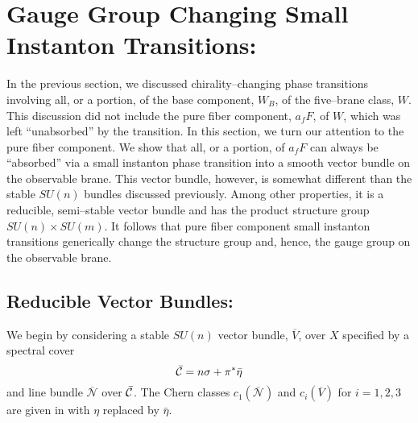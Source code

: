 \documentclass[a4paper,12pt]{article}
\numberwithin{equation}{section}
\def\cN{{\mathcal N}}
\theoremstyle{plain}
\begin{document}

\section{Gauge Group Changing Small Instanton Transitions:}


In the previous section, we discussed chirality--changing 
phase transitions involving all, or a portion, of the base component, 
$W_{B}$, of the five--brane class, $W$. This discussion did not include the pure
fiber component, $a_{f}F$, of $W$, which was left ``unabsorbed'' by the
transition. In this section, we turn our attention to the pure fiber
component. We show that all, or a portion, of $a_{f}F$ 
can always be ``absorbed'' via a small instanton
phase transition into a smooth vector bundle on the observable brane. This
vector bundle, however, is somewhat different than the stable
$SU(n)$ bundles discussed previously. Among other properties, it is a 
reducible, semi--stable vector bundle and has the product 
structure group $SU(n) \times SU(m)$. 
It follows that pure fiber component small instanton transitions generically 
change the structure group and, hence, the gauge group on the observable
brane.

\subsection*{Reducible Vector Bundles:}

We begin by considering a stable $SU(n)$ vector bundle,
$\overline{V}$, over 
$X$ specified by a spectral cover 
\begin{equation}
\bar{\cal{C}}=n\sigma+\pi^{*}\bar{\eta}
\label{eq:127}
\end{equation}
and line bundle $\overline{\cN}$ over $\bar{\cal{C}}$. The Chern classes
$c_{1}(\overline{\cN})$ and $c_{i}(\overline{V})$ for $i=1,2,3$ are given in
with $\eta$ replaced by $\bar{\eta}$.
\end{document}
